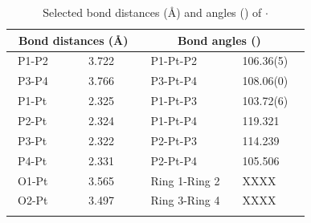 \begin{table}[ht]
\caption[Selected bond distances (\AA) and angles (\degrees) of \ce{StBu-xantphos(H)]CPh(SO2CF3)2}$\cdot{}$ ]{Selected bond distances (\AA) and angles (\degrees) of \ce{StBu-xantphos(H)]CPh(SO2CF3)2}$\cdot{}$ } 
\label{table:crystalbisthixantphosplatinum:lengths}
\begin{center}
\begin{tabular}{l l l l}
	\toprule
	\multicolumn{2}{l}{\bfseries{~Bond distances (\si{\angstrom})}} & \multicolumn{2}{c}{\bfseries{Bond angles (\degrees)}} \\
	\midrule		
	~P1-P2		~~&~~3.722~~	&~~P1-Pt-P2			&~~106.36(5)~~	\\	
	~P3-P4		~~&~~3.766~~	&~~P3-Pt-P4			&~~108.06(0)~~	\\
	~P1-Pt		~~&~~2.325~~	&~~P1-Pt-P3			&~~103.72(6)~~	\\
	~P2-Pt		~~&~~2.324~~	&~~P1-Pt-P4			&~~119.321~~		\\
	~P3-Pt		~~&~~2.322~~	&~~P2-Pt-P3			&~~114.239~~		\\
	~P4-Pt		~~&~~2.331~~	&~~P2-Pt-P4			&~~105.506~~		\\
	~O1-Pt		~~&~~3.565~~	&~~Ring 1-Ring 2		&~~XXXX~~		\\
	~O2-Pt		~~&~~3.497~~	&~~Ring 3-Ring 4		&~~XXXX~~		\\
	\bottomrule{}
\label{table:crystalprotonated:lengths}
\end{tabular}
\end{center}
\end{table}

